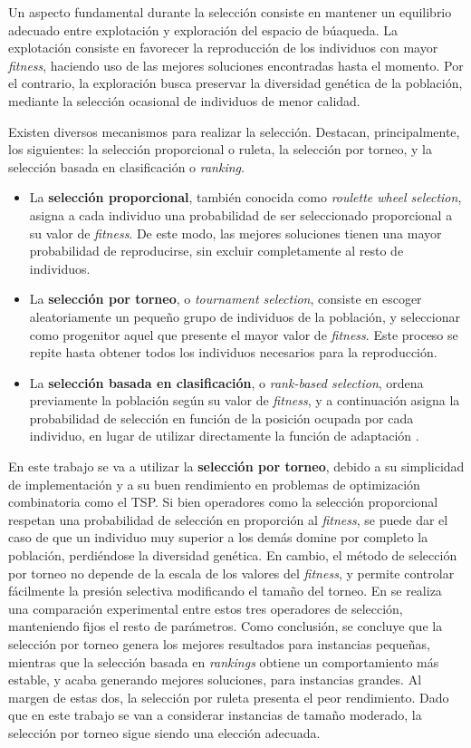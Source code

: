 Un aspecto fundamental durante la selección consiste en mantener un equilibrio adecuado entre explotación y exploración del 
espacio de búaqueda. La explotación consiste en favorecer la reproducción de los individuos con mayor \textit{fitness}, haciendo
uso de las mejores soluciones encontradas hasta el momento. Por el contrario, la exploración busca preservar la diversidad 
genética de la población, mediante la selección ocasional de individuos de menor calidad.

Existen diversos mecanismos para realizar la selección. Destacan, principalmente, los siguientes: la selección proporcional o 
ruleta, la selección por torneo, y la selección basada en clasificación o \textit{ranking}.

\begin{itemize}
  \item La \textbf{selección proporcional}, también conocida como \textit{roulette wheel selection}, asigna a cada individuo una
probabilidad de ser seleccionado proporcional a su valor de \textit{fitness}. De este modo, las mejores soluciones tienen una 
mayor probabilidad de reproducirse, sin excluir completamente al resto de individuos. 
  \item La \textbf{selección por torneo}, o \textit{tournament selection}, consiste en escoger aleatoriamente un pequeño grupo de
individuos de la población, y seleccionar como progenitor aquel que presente el mayor valor de \textit{fitness}. Este proceso se
repite hasta obtener todos los individuos necesarios para la reproducción.
  \item La \textbf{selección basada en clasificación}, o \textit{rank-based selection}, ordena previamente la población según su valor 
de \textit{fitness}, y a continuación asigna la probabilidad de selección en función de la posición ocupada por cada individuo,
en lugar de utilizar directamente la función de adaptación \cite{razali2011}.
\end{itemize}

En este trabajo se va a utilizar la \textbf{selección por torneo}, debido a su simplicidad de implementación y a su buen rendimiento en 
problemas de optimización combinatoria como el TSP. Si bien operadores como la selección proporcional respetan una probabilidad de 
selección en proporción al \textit{fitness}, se puede dar el caso de que un individuo muy superior a los demás domine por completo
la población, perdiéndose la diversidad genética. En cambio, el método de selección por torneo no depende de la escala de los
valores del \textit{fitness}, y permite controlar fácilmente la presión selectiva modificando el tamaño del torneo. En 
\cite{razali2011} se realiza una comparación experimental entre estos tres operadores de selección, manteniendo fijos el resto de 
parámetros. Como conclusión, se concluye que la selección por torneo genera los mejores resultados para instancias pequeñas, 
mientras que la selección basada en \textit{rankings} obtiene un comportamiento más estable, y acaba generando mejores soluciones, 
para instancias grandes. Al margen de estas dos, la selección por ruleta presenta el peor rendimiento. Dado que en este trabajo se
van a considerar instancias de tamaño moderado, la selección por torneo sigue siendo una elección adecuada.

